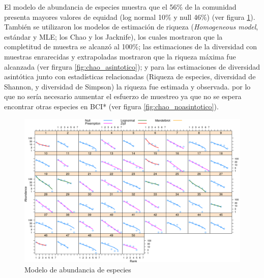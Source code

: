 \documentclass[11pt,]{article}
\begin{document}
El modelo de abundancia de especies muestra que el 56\% de la comunidad
presenta mayores valores de equidad (log normal 10\% y null 46\%) (ver
figura \ref{fig:modelo_abundancia}). También se utilizaron los modelos
de estimación de riqueza (\emph{Homogeneous model}, estándar y MLE; los
Chao y los Jacknife), los cuales mostraron que la completitud de muestra
se alcanzó al 100\%; las estimaciones de la diversidad con muestras
enrarecidas y extrapoladas mostraron que la riqueza máxima fue alcanzada
(ver firgura \ref{fig:chao_asintotico}); y para las estimaciones de
diversidad asintótica junto con estadísticas relacionadas (Riqueza de
especies, diversidad de Shannon, y diversidad de Simpson) la riqueza fue
estimada y observada. por lo que no sería necesario aumentar el esfuerzo
de muestreo ya que no se espera encontrar otras especies en BCI* (ver
figura \ref{fig:chao_noasintotico}).

\begin{figure}
\centering
\includegraphics{modelodeabundancia.png}
\caption{Modelo de abundancia de especies \label{fig:modelo_abundancia}}
\end{figure}
\end{document}
